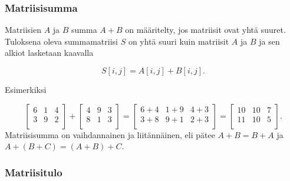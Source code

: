 \subsubsection{Matriisisumma}

Matriisien $A$ ja $B$ summa $A+B$ on määritelty,
jos matriisit ovat yhtä suuret.
Tuloksena oleva summamatriisi $S$ on yhtä suuri kuin
matriisit $A$ ja $B$ ja sen alkiot
lasketaan kaavalla

\[ S[i,j]=A[i,j]+B[i,j]. \]

Esimerkiksi

\[
 \begin{bmatrix}
  6 & 1 & 4 \\
  3 & 9 & 2 \\
 \end{bmatrix}
+
 \begin{bmatrix}
  4 & 9 & 3 \\
  8 & 1 & 3 \\
 \end{bmatrix}
=
 \begin{bmatrix}
  6+4 & 1+9 & 4+3 \\
  3+8 & 9+1 & 2+3 \\
 \end{bmatrix}
=
 \begin{bmatrix}
  10 & 10 & 7 \\
  11 & 10 & 5 \\
 \end{bmatrix}.
\]
Matriisisumma on vaihdannainen ja liitännäinen,
eli pätee $A+B=B+A$ ja $A+(B+C)=(A+B)+C$.
% 

\subsubsection{Matriisitulo}

